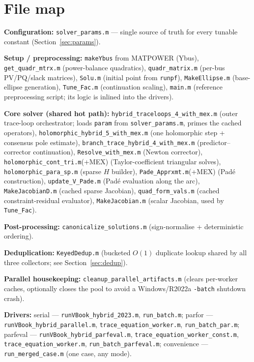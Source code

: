 \documentclass[11pt,a4paper]{article}
\newcommand{\code}[1]{\texttt{#1}}
\begin{document}
\section{File map}

\textbf{Configuration:} \code{solver_params.m} --- single source of truth for every
tunable constant (Section~\ref{sec:params}).

\textbf{Setup / preprocessing:}
\code{makeYbus} from MATPOWER (Ybus), \code{get_quadr_mtrx.m} (power-balance quadratics),
\code{quadr_matrix.m} (per-bus PV/PQ/slack matrices), \code{Solu.m} (initial point from
\code{runpf}), \code{MakeEllipse.m} (base-ellipse generation), \code{Tune_Fac.m}
(continuation scaling), \code{main.m} (reference preprocessing script; its logic is
inlined into the drivers).

\textbf{Core solver (shared hot path):}
\code{hybrid_traceloops_4_with_mex.m} (outer trace-loop orchestrator; loads \code{param}
from \code{solver_params.m}, primes the cached operators), \code{holomorphic_hybrid_5_with_mex.m} (one
holomorphic step + consensus pole estimate), \code{branch_trace_hybrid_4_with_mex.m}
(predictor--corrector continuation), \code{Resolve_with_mex.m} (Newton corrector),
\code{holomorphic_cont_tri.m}(+MEX) (Taylor-coefficient triangular solves),
\code{holomorphic_para_sp.m} (sparse $H$ builder), \code{Pade_Apprxmt.m}(+MEX) (Pad\'e
construction), \code{update_V_Pade.m} (Pad\'e evaluation along the arc),
\code{MakeJacobianD.m} (cached sparse Jacobian), \code{quad_form_vals.m} (cached
constraint-residual evaluator), \code{MakeJacobian.m} (scalar Jacobian, used by
\code{Tune_Fac}).

\textbf{Post-processing:} \code{canonicalize_solutions.m} (sign-normalise + deterministic
ordering).

\textbf{Deduplication:} \code{KeyedDedup.m} (bucketed $O(1)$ duplicate lookup shared by all
three collectors; see Section~\ref{sec:dedup}).

\textbf{Parallel housekeeping:} \code{cleanup_parallel_artifacts.m} (clears per-worker
caches, optionally closes the pool to avoid a Windows/R2022a \code{-batch} shutdown
crash).

\textbf{Drivers:}
serial --- \code{runVBook_hybrid_2023.m}, \code{run_batch.m};
parfor --- \code{runVBook_hybrid_parallel.m}, \code{trace_equation_worker.m},
\code{run_batch_par.m};
parfeval --- \code{runVBook_hybrid_parfeval.m}, \code{trace_equation_worker_const.m},
\code{trace_equation_worker.m}, \code{run_batch_parfeval.m};
convenience --- \code{run_merged_case.m} (one case, any mode).
\end{document}
